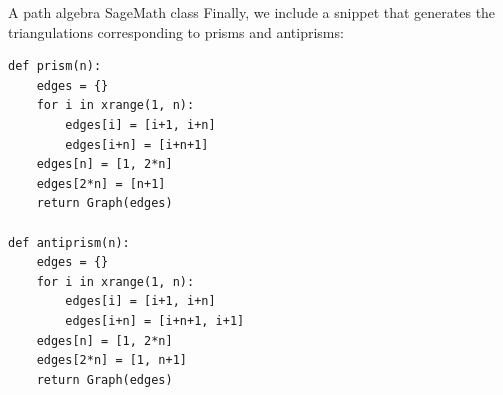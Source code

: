 \begin{chapter}{A path algebra SageMath class}
Finally, we include a snippet that generates the triangulations corresponding to prisms and antiprisms:

\begin{lstlisting}
def prism(n):
    edges = {}
    for i in xrange(1, n):
        edges[i] = [i+1, i+n]
        edges[i+n] = [i+n+1]
    edges[n] = [1, 2*n]
    edges[2*n] = [n+1]
    return Graph(edges)

def antiprism(n):
    edges = {}
    for i in xrange(1, n):
        edges[i] = [i+1, i+n]
        edges[i+n] = [i+n+1, i+1]
    edges[n] = [1, 2*n]
    edges[2*n] = [1, n+1]
    return Graph(edges)
\end{lstlisting}
\end{chapter}